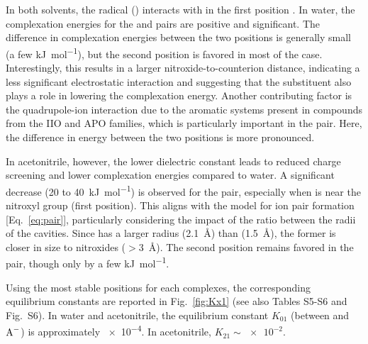 \documentclass[review,preprint]{elsarticle}
\begin{document}
In both solvents, the radical () interacts with  in the first position \cite{zhangEffectHeteroatomFunctionality2018}. In water, the complexation energies for the  and  pairs are positive and significant. The difference in complexation energies between the two positions is generally small (a few \si{\kilo\joule\per\mole}), but the second position is favored in most of the case. Interestingly, this results in a larger nitroxide-to-counterion distance, indicating a less significant electrostatic interaction and suggesting that the substituent also plays a role in lowering the complexation energy. Another contributing factor is the quadrupole-ion interaction due to the aromatic systems present in compounds from the IIO and APO families, which is particularly important in the  pair. Here, the difference in energy between the two positions is more pronounced.

In acetonitrile, however, the lower dielectric constant leads to reduced charge screening and lower complexation energies compared to water. A significant decrease (20 to \SI{40}{\kilo\joule\per\mole}) is observed for the  pair, especially when  is near the nitroxyl group (first position). This aligns with the model for ion pair formation [Eq.~\eqref{eq:pair}], particularly considering the impact of the ratio between the radii of the cavities. Since  has a larger radius (\SI{2.1}{\angstrom}) than  (\SI{1.5}{\angstrom}), the former is closer in size to nitroxides ($>$\SI{3}{\angstrom}). The second position remains favored in the  pair, though only by a few \si{\kilo\joule\per\mole}.



Using the most stable positions for each complexes, the corresponding equilibrium constants are reported in Fig.~\ref{fig:Kx1} (see also Tables S5-S6 and Fig.~S6). In water and acetonitrile, the equilibrium constant $K_{01}$ (between  and $\ce{A-}$) is approximately \num{e-4}. In acetonitrile, $K_{21} \sim \num{e-2}$. 
\end{document}
